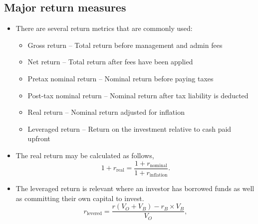 \documentclass[../notes_compiled.tex]{subfiles}
\begin{document}
\subsection{Major return measures}
\begin{itemize}
\item There are several return metrics that are commonly used:
\begin{itemize}
\item Gross return -- Total return before management and admin fees
\item Net return -- Total return after fees have been applied
\item Pretax nominal return -- Nominal return before paying taxes
\item Post-tax nominal return -- Nominal return after tax liability is deducted
\item Real return -- Nominal return adjusted for inflation
\item Leveraged return -- Return on the investment relative to cash paid upfront
\end{itemize}
\item The real return may be calculated as follows,
\begin{equation}
1+r_{\text{real}} = \frac{1+r_{\text{nominal}}}{1+r_{\text{inflation}}}.
\end{equation}
\item The leveraged return is relevant where an investor has borrowed funds as well as committing their own capital to invest.
\begin{equation}
r_\text{levered} = \frac{r\left( V_{O}+V_{B}\right)-r_{B}\times V_{B}}{V_{O}},
\end{equation}


\end{itemize}
\end{document}
